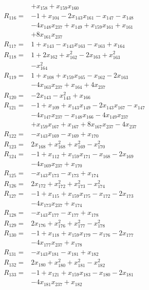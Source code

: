 \begin{align*}
&+x_{158} +x_{159}x_{160}\\[3pt]
R_{116}={}&-1 +x_{104} -2x_{143}x_{161} -x_{147} -x_{148}\\
&-4x_{148}x_{237} +x_{149} +x_{159}x_{161} +x_{161}\\
&+8x_{161}x_{237}\\[3pt]
R_{117}={}&1 +x_{143} -x_{143}x_{163} -x_{163} +x_{164}\\[3pt]
R_{118}={}&1 +2x_{162} +x_{162}^{2} -2x_{163} +x_{163}^{2}\\
&-x_{164}^{2}\\[3pt]
R_{119}={}&1 +x_{108} +x_{159}x_{165} -x_{162} -2x_{163}\\
&-4x_{163}x_{237} +x_{164} +4x_{237}\\[3pt]
R_{120}={}&-2x_{143} -x_{143}^{2} +x_{166}\\[3pt]
R_{121}={}&-1 +x_{109} +x_{143}x_{149} -2x_{143}x_{167} -x_{147}\\
&-4x_{147}x_{237} -x_{148}x_{166} -4x_{149}x_{237}\\
&+x_{159}x_{167} +x_{167} +8x_{167}x_{237} -4x_{237}\\[3pt]
R_{122}={}&-x_{143}x_{169} -x_{169} +x_{170}\\[3pt]
R_{123}={}&2x_{168} +x_{168}^{2} +x_{169}^{2} -x_{170}^{2}\\[3pt]
R_{124}={}&-1 +x_{112} +x_{159}x_{171} -x_{168} -2x_{169}\\
&-4x_{169}x_{237} +x_{170}\\[3pt]
R_{125}={}&-x_{143}x_{173} -x_{173} +x_{174}\\[3pt]
R_{126}={}&2x_{172} +x_{172}^{2} +x_{173}^{2} -x_{174}^{2}\\[3pt]
R_{127}={}&-1 +x_{115} +x_{159}x_{175} -x_{172} -2x_{173}\\
&-4x_{173}x_{237} +x_{174}\\[3pt]
R_{128}={}&-x_{143}x_{177} -x_{177} +x_{178}\\[3pt]
R_{129}={}&2x_{176} +x_{176}^{2} +x_{177}^{2} -x_{178}^{2}\\[3pt]
R_{130}={}&-1 +x_{118} +x_{159}x_{179} -x_{176} -2x_{177}\\
&-4x_{177}x_{237} +x_{178}\\[3pt]
R_{131}={}&-x_{143}x_{181} -x_{181} +x_{182}\\[3pt]
R_{132}={}&2x_{180} +x_{180}^{2} +x_{181}^{2} -x_{182}^{2}\\[3pt]
R_{133}={}&-1 +x_{121} +x_{159}x_{183} -x_{180} -2x_{181}\\
&-4x_{181}x_{237} +x_{182}\\[3pt]

\end{align*}
